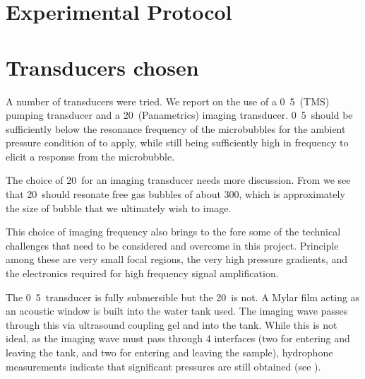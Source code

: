 
\section{Experimental Protocol}\label{sec:DPR500_protocol}




\section{Transducers chosen}
A number of transducers were tried.
We report on the use of a  \unit{0.5}\mega\hertz\ (TMS) pumping transducer and a 20\mega\hertz\ (Panametrics) imaging transducer.
 \unit{0.5}\mega\hertz\ should be sufficiently below the resonance frequency of the microbubbles for the ambient pressure condition of  
to apply, while still being sufficiently high in frequency to elicit a response from the microbubble.

The choice of 20\mega\hertz\ for an imaging transducer needs more discussion.
From  we see that 20\mega\hertz\ should  resonate free gas bubbles of about 300\nano\metre,
which is approximately the size of bubble  that we ultimately wish to image.

This choice of imaging frequency also brings to the fore some of the technical challenges that need to be considered and overcome in this project.
Principle among these are very small focal regions,  the very high pressure gradients, 
and the electronics required for high frequency signal amplification.



The  \unit{0.5}\mega\hertz\ transducer is fully submersible but the 20\mega\hertz\ is not.
A Mylar film acting as an acoustic window is built into the water tank used.
The imaging wave passes through this via ultrasound coupling gel and into the tank.
While this is not ideal,
as the imaging wave must pass through 4 interfaces (two for entering and leaving the tank, and two for entering and leaving the sample),
hydrophone measurements indicate that significant pressures are still obtained (see ).


